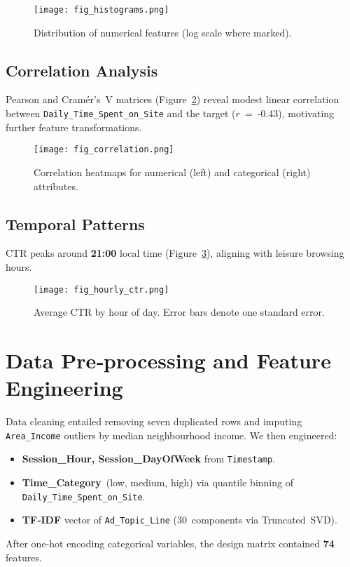 \documentclass[12pt]{article}
\begin{document}
\begin{figure}[H]
    \centering
    \texttt{[image: fig\_histograms.png]}
    \caption{Distribution of numerical features (log scale where marked).}
    \label{fig:histograms}
\end{figure}

\subsection{Correlation Analysis}
Pearson and Cramér's~V matrices (Figure~\ref{fig:correlation}) reveal modest linear correlation between \texttt{Daily\_Time\_Spent\_on\_Site} and the target (\textit{$r$} = \num{‑0.43}), motivating further feature transformations.

\begin{figure}[H]
    \centering
    \texttt{[image: fig\_correlation.png]}
    \caption{Correlation heatmaps for numerical (left) and categorical (right) attributes.}
    \label{fig:correlation}
\end{figure}

\subsection{Temporal Patterns}
CTR peaks around \textbf{21:00} local time (Figure~\ref{fig:hourly_ctr}), aligning with leisure browsing hours.

\begin{figure}[H]
    \centering
    \texttt{[image: fig\_hourly\_ctr.png]}
    \caption{Average CTR by hour of day. Error bars denote one standard error.}
    \label{fig:hourly_ctr}
\end{figure}

\section{Data Pre‑processing and Feature Engineering}\label{sec:preprocessing}
Data cleaning entailed removing seven duplicated rows and imputing \texttt{Area\_Income} outliers by median neighbourhood income. We then engineered:
\begin{itemize}[noitemsep]
  \item \textbf{Session\_Hour, Session\_DayOfWeek} from \texttt{Timestamp}.
  \item \textbf{Time\_Category} (low, medium, high) via quantile binning of \texttt{Daily\_Time\_Spent\_on\_Site}.
  \item \textbf{TF‑IDF} vector of \texttt{Ad\_Topic\_Line} (30 components via Truncated SVD).
\end{itemize}
After one‑hot encoding categorical variables, the design matrix contained \textbf{74} features.
\end{document}
